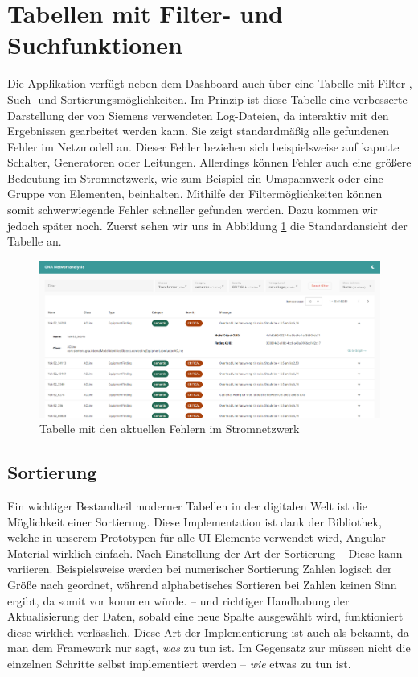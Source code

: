 \section{Tabellen mit Filter- und Suchfunktionen}

Die Applikation verfügt neben dem Dashboard auch über eine Tabelle mit Filter-, Such- und Sortierungsmöglichkeiten. Im Prinzip ist diese Tabelle eine verbesserte Darstellung der von Siemens verwendeten Log-Dateien, da interaktiv mit den Ergebnissen gearbeitet werden kann. Sie zeigt standardmäßig alle gefundenen Fehler im Netzmodell an. Dieser Fehler beziehen sich beispielsweise auf kaputte Schalter, Generatoren oder Leitungen. Allerdings können Fehler auch eine größere Bedeutung im Stromnetzwerk, wie zum Beispiel ein Umspannwerk oder eine Gruppe von Elementen, beinhalten. Mithilfe der Filtermöglichkeiten können somit schwerwiegende Fehler schneller gefunden werden. Dazu kommen wir jedoch später noch. Zuerst sehen wir uns in Abbildung \ref{fig:AngularFindingsPrototype} die Standardansicht der Tabelle an.

\begin{figure}
    \centering
    \includegraphics[width=1\textwidth]{content/img/Empire/Frontend/Angular_Findings_Prototype.png}
    \caption{Tabelle mit den aktuellen Fehlern im Stromnetzwerk}
    \label{fig:AngularFindingsPrototype}
\end{figure}
\FloatBarrier

\subsection{Sortierung}

Ein wichtiger Bestandteil moderner Tabellen in der digitalen Welt ist die Möglichkeit einer Sortierung. Diese Implementation ist dank der Bibliothek, welche in unserem Prototypen für alle UI-Elemente verwendet wird, Angular Material wirklich einfach. Nach Einstellung der Art der Sortierung -- Diese kann variieren. Beispielsweise werden bei numerischer Sortierung Zahlen logisch der Größe nach geordnet, während alphabetisches Sortieren bei Zahlen keinen Sinn ergibt, da somit  vor  kommen würde. -- und richtiger Handhabung der Aktualisierung der Daten, sobald eine neue Spalte ausgewählt wird, funktioniert diese wirklich verlässlich. Diese Art der Implementierung ist auch als  bekannt, da man dem Framework nur sagt, \emph{was} zu tun ist. Im Gegensatz zur 
  müssen nicht die einzelnen Schritte selbst implementiert werden -- \emph{wie} etwas zu tun ist.

